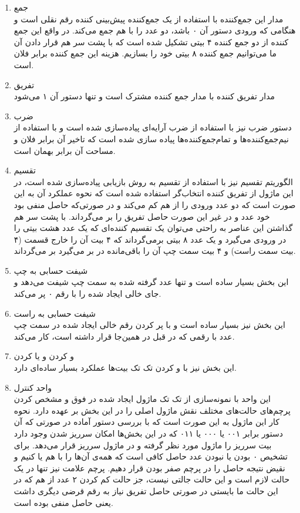 \documentclass{article}[12pt]
\begin{document}
\begin{enumerate}
\item جمع\\
مدار این جمع‌کننده با استفاده از یک جمع‌کننده پیش‌بینی کننده رقم نقلی است و هنگامی که ورودی دستور آن ۰ باشد، دو عدد را با هم جمع می‌کند. در واقع این جمع کننده از دو جمع کننده ۴ بیتی تشکیل شده است که با پشت سر هم قرار دادن آن ما می‌توانیم جمع کننده ۸ بیتی خود را بسازیم. هزینه این جمع کننده برابر فلان است.
\item تفریق\\
مدار تفریق کننده با مدار جمع کننده مشترک است و تنها دستور آن ۱ می‌شود
\item ضرب\\
دستور ضرب نیز با استفاده از ضرب آرایه‌ای پیاده‌سازی شده است و با استفاده از نیم‌جمع‌کننده‌ها و تمام‌جمع‌کننده‌ها پیاده سازی شده است که تاخیر آن برابر فلان و مساحت آن برابر بهمان است.
\item تقسیم\\
الگوریتم تقسیم نیز با استفاده از تقسیم به روش بازیابی پیاده‌سازی شده است، در این ماژول از تفریق کننده انتخاب‌گر استفاده شده است که نحوه عملکرد آن به این صورت است که دو عدد ورودی را از هم کم می‌کند و در صورتی‌که حاصل منفی بود خود عدد و در غیر این صورت حاصل تفریق را بر می‌گرداند. با پشت سر هم گذاشتن این عناصر به راحتی می‌توان یک تقسیم کننده‌ای که یک عدد هشت بیتی را در ورودی می‌گیرد و یک عدد ۸ بیتی برمی‌گرداند که ۴ بیت آن را خارج قسمت (‌۴ بیت سمت راست) و ۴ بیت سمت چپ آن را باقی‌مانده در بر می‌گیرد بر می‌گرداند.
\item شیفت حسابی به چپ\\
این بخش بسیار ساده است و تنها عدد گرفته شده به سمت چپ شیفت می‌دهد و جای خالی ایجاد شده را با رقم ۰ پر می‌کند.
\item شیفت حسابی به راست\\
این بخش نیز بسیار ساده است و با پر کردن رقم خالی ایجاد شده در سمت چپ عدد با رقمی که در قبل در همین‌جا قرار داشته است، کار می‌کند.
\item و کردن و یا کردن\\
این بخش نیز با و کردن تک تک بیت‌ها عملکرد بسیار ساده‌ای دارد.
\item واحد کنترل\\
این واحد با نمونه‌سازی از تک تک ماژول ایجاد شده در فوق و مشخص کردن پرچم‌های حالت‌های مختلف نقش ماژول اصلی را در این بخش بر عهده دارد. نحوه کار این ماژول به این صورت است که با بررسی دستور آماده در صورتی که آن دستور برابر ۰۰۱ یا ۰۰۰ یا ۰۱۱ که در این بخش‌ها امکان سرریز شدن وجود دارد بیت سرریز را ماژول مورد نظر گرفته و در ماژول سرریز قرار می‌دهد. برای تشخیص ۰ بودن یا نبودن عدد حاصل کافی است که همه‌ی آن‌ها را با هم یا کنیم و نقیض نتیجه حاصل را در پرچم صفر بودن قرار دهیم. پرچم علامت نیز تنها در یک حالت لازم است و این حالت جالتی نیست، جز حالت کم کردن ۲ عدد از هم که در این حالت ما بایستی در صورتی حاصل تفریق نیاز به رقم قرضی دیگری داشت یعنی حاصل منفی بوده است.
\end{enumerate}
\end{document}

